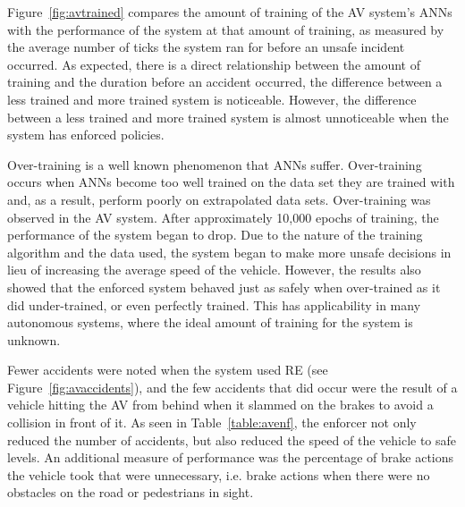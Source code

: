 Figure~\ref{fig:avtrained} compares the amount of training of the \ac{AV} system's \acp{ANN} with the performance of the system at that amount of training, as measured by the average number of ticks the system ran for before an unsafe incident occurred.
As expected, there is a direct relationship between the amount of training and the duration before an accident occurred, the difference between a less trained and more trained system is noticeable.
However, the difference between a less trained and more trained system is almost unnoticeable when the system has enforced policies. 

Over-training is a well known phenomenon that \acp{ANN} suffer. 
Over-training occurs when \acp{ANN} become too well trained on the data set they are trained with and, as a result, perform poorly on extrapolated data sets. 
Over-training was observed in the \ac{AV} system.
After approximately 10,000 epochs of training, the performance of the system began to drop. 
Due to the nature of the training algorithm and the data used, the system began to make more unsafe decisions in lieu of increasing the average speed of the vehicle.
However, the results also showed that the enforced system behaved just as safely when over-trained as it did under-trained, or even perfectly trained. 
This has applicability in many autonomous systems, where the ideal amount of training for the system is unknown. 

Fewer accidents were noted when the system used \ac{RE} (see Figure~\ref{fig:avaccidents}), and the few accidents that did occur were the result of a vehicle hitting the \ac{AV} from behind when it slammed on the brakes to avoid a collision in front of it.
As seen in Table~\ref{table:avenf}, the enforcer not only reduced the number of accidents, but also reduced the speed of the vehicle to safe levels. 
An additional measure of performance was the percentage of brake actions the vehicle took that were unnecessary, i.e. brake actions when there were no obstacles on the road or pedestrians in sight.

